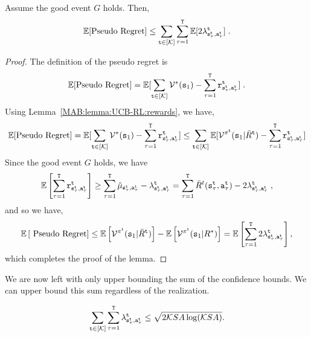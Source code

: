 \begin{lemma}
\label{MAB:lemma:UCB-RL:optimism}
Assume the good event $G$ holds. Then,
    \[
    \mathbb{E}[\text{Pseudo Regret}] \leq \sum_{{\tt t}\in [\mathcal K]} \sum_{\tau=1}^{\tt T}
    \mathbb{E}[2\lambda^{\tt t}_{{\tt s}^{\tt t}_\tau,{\tt a}^{\tt t}_\tau}]\;.
    \]
\end{lemma}

\begin{proof}
    The definition of the pseudo regret is
    \[
    \mathbb{E}[\text{Pseudo Regret}]= \mathbb{E}[\sum_{{\tt t}\in [\mathcal K]} \mathcal{V}^*({\tt s}_1)-\sum_{\tau=1}^{\tt T} {\tt r}^{\tt t}_{{\tt s}_\tau^{\tt t},{\tt a}_\tau^{\tt t}}]\;.
    \]
Using Lemma~\ref{MAB:lemma:UCB-RL:rewards}, we have,
    \[
    \mathbb{E}[\text{Pseudo Regret}]= \mathbb{E}[\sum_{{\tt t}\in [\mathcal K]} \mathcal{V}^*({\tt s}_1)-\sum_{\tau=1}^{\tt T} {\tt r}^{\tt t}_{{\tt s}_\tau^{\tt t},{\tt a}_\tau^{\tt t}}]
    \leq
    \sum_{{\tt t}\in [\mathcal K]}
    \mathbb{E}[\mathcal{V}^{\pi^{\tt t}}({\tt s}_1|\bar{R}^{\tt t})
    -\sum_{\tau=1}^{\tt T} {\tt r}^{\tt t}_{{\tt s}_\tau^{\tt t},{\tt a}_\tau^{\tt t}}]
    \]
Since the good event $G$ holds, we have 
\[
\mathbb{E}\left[\sum_{\tau=1}^{\tt T} {\tt r}^{\tt t}_{{\tt s}_\tau^{\tt t},{\tt a}_\tau^{\tt t}}\right] \geq \sum_{\tau=1}^{\tt T}
 \hat{\mu}_{{\tt s}_\tau^{\tt t},{\tt a}_\tau^{\tt t}}-\lambda^{\tt t}_{{\tt s}_\tau^{\tt t},{\tt a}_\tau^{\tt t}}=\sum_{\tau=1}^{\tt T}\bar{R}^t({\tt s}_\tau^{\tt t},{\tt a}_\tau^{\tt t})-2\lambda^{\tt t}_{{\tt s}_\tau^{\tt t},{\tt a}_\tau^{\tt t}}\;,
\]
and so we have,
\[
\mathbb{E}\left[\text{ Pseudo Regret}\right]\leq \mathbb{E}\left[\mathcal{V}^{\pi^{\tt t}}({\tt s}_1|\bar{R}^{\tt t})\right] -
\mathbb{E}\left[\mathcal{V}^{\pi^{\tt t}}({\tt s}_1|R^*)\right]=
\mathbb{E}\left[\sum_{\tau=1}^{\tt T} 2\lambda^{\tt t}_{{\tt s}_\tau^{\tt t},{\tt a}_\tau^{\tt t}} \right],
\]
which completes the proof of the lemma.
\end{proof}

We are now left with only upper bounding the sum of the confidence bounds.
We can upper bound this sum regardless of the realization. 

\begin{lemma}
    \[
    \sum_{{\tt t}\in [\mathcal K]} \sum_{\tau=1}^{\tt T}
\lambda^{\tt t}_{{\tt s}_\tau^{\tt t},{\tt a}_\tau^{\tt t}}
    \leq \sqrt{2\mathcal K SA\log (\mathcal K SA)}.
    \]
\end{lemma}

